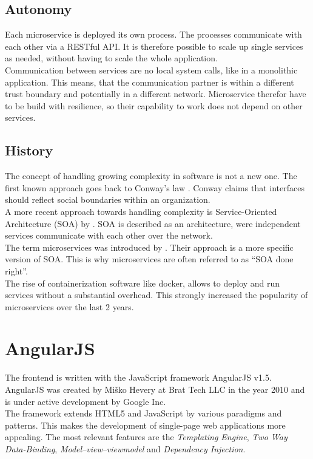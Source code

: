 \subsection{Autonomy}
Each microservice is deployed its own process. The processes communicate with each other via a RESTful API. It is therefore possible to scale up single services as needed, without having to scale the whole application.\\
Communication between services are no local system calls, like in a monolithic application. This means, that the communication partner is within a different trust boundary and potentially in a different network. Microservice therefor have to be build with resilience, so their capability to work does not depend on other services.


\subsection{History}
The concept of handling growing complexity in software is not a new one. The first known approach goes back to Conway's law \cite{conway1968committees}. Conway claims that interfaces should reflect social boundaries within an organization.\\
A more recent approach towards handling complexity is Service-Oriented Architecture (SOA) by \cite{as2005service}. SOA is described as an architecture, were independent services communicate with each other over the network.\\
The term microservices was introduced by \cite{martinfowler2014microservices}. Their approach is a more specific version of SOA. This is why microservices are often referred to as \enquote{SOA done right}.\\
The rise of containerization software like docker, allows to deploy and run services without a substantial overhead. This strongly increased the popularity of microservices over the last 2 years.



\section{AngularJS}
\label{sec:angularjs}
The frontend is written with the JavaScript framework AngularJS v1.5. AngularJS was created by Miško Hevery at Brat Tech LLC in the year 2010 and is under active development by Google Inc. \\
The framework extends HTML5 and JavaScript by various paradigms and patterns. This makes the development of single-page web applications more appealing. The most relevant features are the \textit{Templating Engine}, \textit{Two Way Data-Binding}, \textit{Model–view–viewmodel} and \textit{Dependency Injection}.


